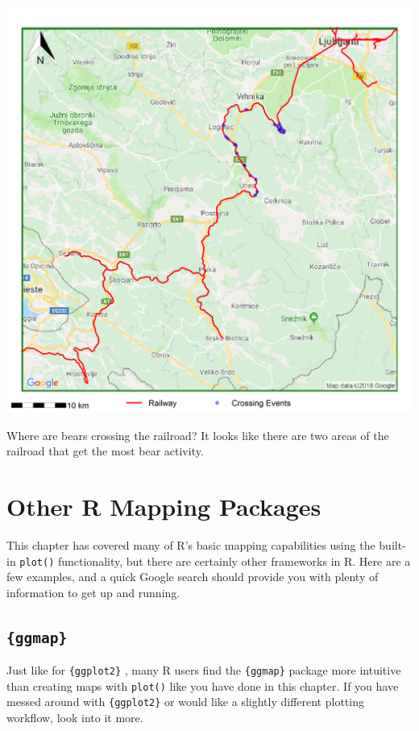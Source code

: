 \documentclass[]{book}
\theoremstyle{definition}
\theoremstyle{definition}
\theoremstyle{definition}
\theoremstyle{remark}
\begin{document}
\begin{center}\includegraphics[width=41.67in]{img/FinalMap} \end{center}

Where are bears crossing the railroad? It looks like there are two areas
of the railroad that get the most bear activity.

\section{Other R Mapping Packages}\label{other-r-mapping-packages}

This chapter has covered many of R's basic mapping capabilities using
the built-in \texttt{plot()} functionality, but there are certainly
other frameworks in R. Here are a few examples, and a quick Google
search should provide you with plenty of information to get up and
running.

\subsection{\texorpdfstring{\texttt{\{ggmap\}}}{\{ggmap\}}}\label{ggmap}

Just like for \texttt{\{ggplot2\}} \citep{R-ggplot2}, many R users find
the \texttt{\{ggmap\}} \citep{R-ggmap} package more intuitive than
creating maps with \texttt{plot()} like you have done in this chapter.
If you have messed around with \texttt{\{ggplot2\}} or would like a
slightly different plotting workflow, look into it more.
\end{document}

